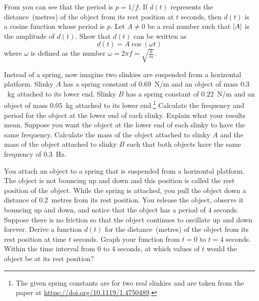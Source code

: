 \documentclass[a4paper,oneside,12pt]{article}
\begin{document}
\begin{problem}
\begin{packedenum}
  \item\label{subprob:trigonometric:spring_model}
    From  you can see
    that the period is $p = 1 / f$.  If $d(t)$ represents the
    distance~(metres) of the object from its rest position at $t$
    seconds, then $d(t)$ is a cosine function whose period is $p$.
    Let $A \neq 0$ be a real number such that $\lvert A\rvert$ is
    the amplitude of $d(t)$.  Show that $d(t)$ can be written as
    \[
    d(t)
    =
    A \cos(\omega t)
    \]
    where $\omega$ is defined as the number
    $\omega = 2\pi f = \sqrt{\frac{k}{m}}$.

  \item\label{subprob:trigonometric:spring_slinky}
    Instead of a spring, now imagine two slinkies are suspended from a
    horizontal platform.  Slinky $A$ has a spring constant of
    $0.69$~N/m and an object of mass $0.3$~kg attached to its lower
    end.  Slinky $B$ has a spring constant of $0.22$~N/m and an object
    of mass $0.05$~kg attached to its lower end.\footnote{
      The given spring constants are for two real slinkies and are
      taken from the paper at
      \url{https://doi.org/10.1119/1.4750489}.
    }
    Calculate the frequency and period for the object at the lower end
    of each slinky.  Explain what your results mean.  Suppose you want
    the object at the lower end of each slinky to have the same
    frequency.  Calculate the mass of the object attached to slinky
    $A$ and the mass of the object attached to slinky $B$ such that
    both objects have the same frequency of $0.3$~Hz.

  \item\label{subprob:trigonometric:spring_displacement}
    You attach an object to a spring that is suspended from a
    horizontal platform.  The object is not bouncing up and down and
    this position is called the rest position of the object.  While
    the spring is attached, you pull the object down a distance of
    $0.2$~metres from its rest position.  You release the object,
    observe it bouncing up and down, and notice that the object has a
    period of $4$ seconds.  Suppose there is no friction so that the
    object continues to oscillate up and down forever.  Derive a
    function $d(t)$ for the distance~(metres) of the object from its
    rest position at time $t$ seconds.  Graph your function from
    $t = 0$ to $t = 4$ seconds.  Within the time interval from $0$ to
    $4$ seconds, at which values of $t$ would the object be at its
    rest position?


\end{packedenum}
\end{problem}
\end{document}
